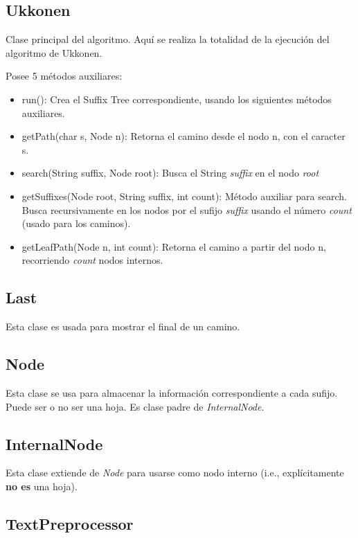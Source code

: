 \documentclass[letterpaper,10pt]{article}
\begin{document}
	\subsection{Ukkonen}

	Clase principal del algoritmo. Aquí se realiza la totalidad de la ejecución del algoritmo de Ukkonen.

	Posee 5 métodos auxiliares:
	\begin{itemize}
		\item run(): Crea el Suffix Tree correspondiente, usando los siguientes métodos auxiliares.
		\item getPath(char s, Node n): Retorna el camino desde el nodo n, con el caracter s.
		\item search(String suffix, Node root): Busca el String \textit{suffix} en el nodo \textit{root}
		\item getSuffixes(Node root, String suffix, int count): Método auxiliar para search. Busca recursivamente en los nodos por el sufijo \textit{suffix} usando
		el número \textit{count} (usado para los caminos).
		\item getLeafPath(Node n, int count): Retorna el camino a partir del nodo n, recorriendo \textit{count} nodos internos.
	\end{itemize}

	\subsection{Last}

	Esta clase es usada para mostrar el final de un camino.

	\subsection{Node}

	Esta clase se usa para almacenar la información correspondiente a cada sufijo. Puede ser o no ser una hoja. Es clase padre de \textit{InternalNode}.

	\subsection{InternalNode}

	Esta clase extiende de \textit{Node} para usarse como nodo interno (i.e., explícitamente \textbf{no es} una hoja).

	\subsection{TextPreprocessor}
\end{document}
